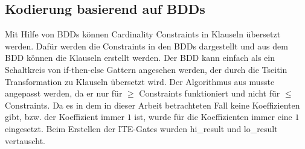 \documentclass[a4,abstract=on]{scrartcl}
\begin{document}
	\subsection{Kodierung basierend auf BDDs}
Mit Hilfe von BDDs können Cardinality Constraints in Klauseln übersetzt werden. Dafür werden die Constraints in den BDDs dargestellt und aus dem BDD können die Klauseln erstellt werden. Der BDD kann einfach als ein Schaltkreis von if-then-else Gattern angesehen werden, der durch die Tseitin Transformation zu Klauseln übersetzt wird. Der Algorithmus aus \cite[][Seite 11]{niklasse} musste angepasst werden, da er nur für $\geq$ Constraints funktioniert und nicht für $\leq$ Constraints. Da es in dem in dieser Arbeit betrachteten Fall keine Koeffizienten gibt, bzw. der Koeffizient immer $1$ ist, wurde für die Koeffizienten  immer eine $1$ eingesetzt. Beim Erstellen der ITE-Gates wurden hi\_result und lo\_result vertauscht.\\
\end{document}
